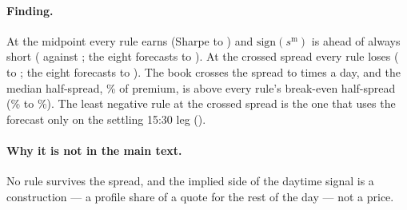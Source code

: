 \begin{table}[H]
\centering
\caption{The re-picked straddle, pooled over the twelve clocks 10:00--15:30 on
the \runappRpNdays{} expiration days. mean/day and $t$ belong to the daily sum
of the twelve legs, and the Sharpe ratio is that sum's mean over its standard
deviation times $\sqrt{252}$. Crossings per day count the trades that cross
the spread (a re-pick onto the same strikes with the same sign is a hold); the
break-even half-spread is the mean daily midpoint profit over the mean
crossings per day, in percent of premium. Panel (a) leaves flat the
\runappRpCensored{} bars whose vendor implied volatility is a censored solver
value; panel (b) re-inverts it from the straddle midpoint, as the main text
does, which moves the block-diagonal ridge from \runappRpSignMid{} to
\runappRpRidgeReinv{}.}
\label{tab:app_run_repick}
\runappfit{\small}
\end{table}

\paragraph{Finding.} At the midpoint every rule earns (Sharpe
\runappRpMidMin{} to \runappRpMidMax{}) and $\mathrm{sign}(s^{\mathrm m})$ is
ahead of always short (\runappRpSignMid{} against \runappRpAsMid{}; the eight
forecasts \runappRpEightMidLo{} to \runappRpEightMidHi{}). At the crossed
spread every rule loses (\runappRpXMin{} to \runappRpXMax{}; the eight
forecasts \runappRpEightXLo{} to \runappRpEightXHi{}). The book crosses the
spread \runappRpXingLo{} to \runappRpXingHi{} times a day, and the median
half-spread, \runappRpHalfSpread{}\% of premium, is above every rule's
break-even half-spread (\runappRpBeLo{}\% to \runappRpBeHi{}\%). The least
negative rule at the crossed spread is the one that uses the forecast only on
the settling 15:30 leg (\runappRpHybX{}).

\paragraph{Why it is not in the main text.} No rule survives the spread, and
the implied side of the daytime signal is a construction --- a profile share of
a quote for the rest of the day --- not a price.

